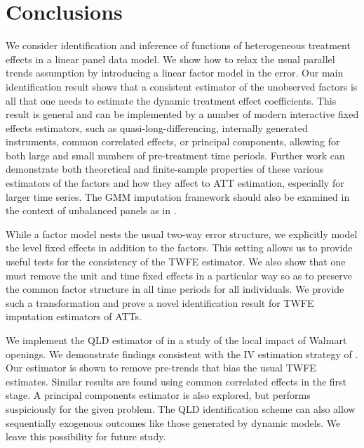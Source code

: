 \section{Conclusions}

We consider identification and inference of functions of heterogeneous treatment effects in a linear panel data model. We show how to relax the usual parallel trends assumption by introducing a linear factor model in the error. Our main identification result shows that a consistent estimator of the unobserved factors is all that one needs to estimate the dynamic treatment effect coefficients. This result is general and can be implemented by a number of modern interactive fixed effects estimators, such as quasi-long-differencing, internally generated instruments, common correlated effects, or principal components, allowing for both large and small numbers of pre-treatment time periods. Further work can demonstrate both theoretical and finite-sample properties of these various estimators of the factors and how they affect to ATT estimation, especially for larger time series. The GMM imputation framework should also be examined in the context of unbalanced panels as in \citet{Rai_2022}. 

While a factor model nests the usual two-way error structure, we explicitly model the level fixed effects in addition to the factors. This setting allows us to provide useful tests for the consistency of the TWFE estimator. We also show that one must remove the unit and time fixed effects in a particular way so as to preserve the common factor structure in all time periods for all individuals. We provide such a transformation and prove a novel identification result for TWFE imputation estimators of ATTs.

We implement the QLD estimator of \citet{Ahn_Lee_Schmidt_2013} in a study of the local impact of Walmart openings. We demonstrate findings consistent with the IV estimation strategy of \citet{basker2005job}.  Our estimator is shown to remove pre-trends that bias the usual TWFE estimates. Similar results are found using common correlated effects in the first stage. A principal components estimator is also explored, but performs suspiciously for the given problem. The QLD identification scheme can also allow sequentially exogenous outcomes like those generated by dynamic models. We leave this possibility for future study. 
